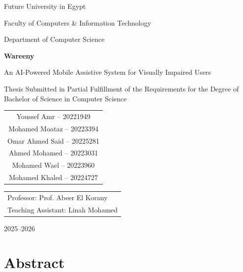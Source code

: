 \documentclass[12pt,a4paper]{report}
\begin{document}
\begin{titlepage}
\centering
{\Large Future University in Egypt\par}
\vspace{0.5cm}
{\large Faculty of Computers \& Information Technology\par}
{\large Department of Computer Science\par}
\vspace{2cm}
{\Huge\bfseries Wareeny\par}
\vspace{0.6cm}
{\Large An AI-Powered Mobile Assistive System for Visually Impaired Users\par}
\vspace{1.5cm}
{\large Thesis Submitted in Partial Fulfillment of the Requirements for the Degree of Bachelor of Science in Computer Science\par}
\vspace{1.5cm}
\begin{tabular}{c}
Youssef Amr -- 20221949 \\
Mohamed Moataz -- 20223394 \\
Omar Ahmed Said -- 20225281 \\
Ahmed Mohamed -- 20223031 \\
Mohamed Wael -- 20223960 \\
Mohamed Khaled -- 20224727 \\
\end{tabular}
\vfill
\begin{tabular}{l}
Professor: Prof. Abeer El Korany \\
Teaching Assistant: Linah Mohamed \\
\end{tabular}
\vfill
{\large 2025--2026\par}
\end{titlepage}

\chapter*{Abstract}
\end{document}
